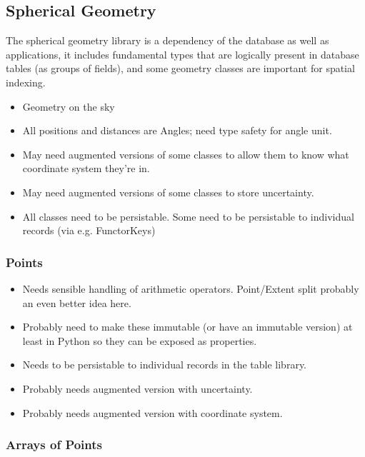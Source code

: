 \subsection{Spherical Geometry}
\label{sec:spSphericalGeometry}

The spherical geometry library is a dependency of the database as well as applications, it includes fundamental types that are logically present in database tables (as groups of fields), and some geometry classes are important for spatial indexing.

\begin{itemize}
\item Geometry on the sky
\item All positions and distances are Angles; need type safety for angle unit.
\item May need augmented versions of some classes to allow them to know what coordinate system they're in.
\item May need augmented versions of some classes to store uncertainty.
\item All classes need to be persistable.  Some need to be persistable to individual records (via e.g. FunctorKeys)
\end{itemize}

\subsubsection{Points}
\label{sec:spSphericalPoints}

\begin{itemize}
\item Needs sensible handling of arithmetic operators.  Point/Extent split probably an even better idea here.
\item Probably need to make these immutable (or have an immutable version) at least in Python so they can be exposed as properties.
\item Needs to be persistable to individual records in the table library.
\item Probably needs augmented version with uncertainty.
\item Probably needs augmented version with coordinate system.
\end{itemize}

\subsubsection{Arrays of Points}
\label{sec:spSphericalPointArrays}

